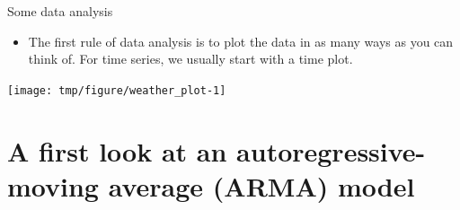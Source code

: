 \begin{frame}{Some data analysis}

\begin{itemize}

\item The first rule of data analysis is to plot the data in as many ways as you can think of. For time series, we usually start with a time plot.

\end{itemize}

\begin{knitrout}\small
{}\color{fgcolor}\begin{kframe}
\begin{alltt}
\hldef{=}\hldef{)}
\end{alltt}
\end{kframe}
\end{knitrout}

\begin{knitrout}\small
{}\color{fgcolor}

{\centering \texttt{[image: tmp/figure/weather\_plot-1]} 

}


\end{knitrout}

\end{frame}

\section{A first look at an autoregressive-moving average (ARMA) model}

